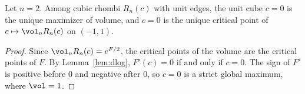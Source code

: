 \begin{theorem}\label{thm:main}
Let $n=2$. Among cubic rhombi $R_n(c)$ with unit edges, the unit cube $c=0$ is the unique maximizer of volume, and $c=0$ is the unique critical point of $c\mapsto\vol_nR_n(c)$ on $(-1,1)$.
\end{theorem}
\begin{proof}
Since $\vol_nR_n(c)=e^{F/2}$, the critical points of the volume are the critical points of $F$.
By Lemma~\ref{lem:dlog}, $F'(c)=0$ if and only if $c=0$.
The sign of $F'$ is positive before $0$ and negative after $0$, so $c=0$ is a strict global maximum, where $\vol=1$.
\end{proof}
